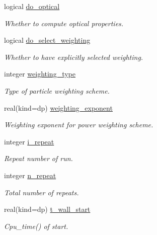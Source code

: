 \begin{DoxyCompactItemize}
logical \mbox{\hyperlink{structpmc__run__part_1_1run__part__opt__t_ac53591fa9c3c20d61beb05219a42abb9}{do\+\_\+optical}}
\begin{DoxyCompactList}\small\item\em Whether to compute optical properties. \end{DoxyCompactList}\item 
logical \mbox{\hyperlink{structpmc__run__part_1_1run__part__opt__t_aecedcb3bed6cb67aca91bda0e76b14d8}{do\+\_\+select\+\_\+weighting}}
\begin{DoxyCompactList}\small\item\em Whether to have explicitly selected weighting. \end{DoxyCompactList}\item 
integer \mbox{\hyperlink{structpmc__run__part_1_1run__part__opt__t_a7a73aba29b76062f29c5be56207eeb51}{weighting\+\_\+type}}
\begin{DoxyCompactList}\small\item\em Type of particle weighting scheme. \end{DoxyCompactList}\item 
real(kind=dp) \mbox{\hyperlink{structpmc__run__part_1_1run__part__opt__t_a212ce2a27235b07ea4c170ac6fab21ee}{weighting\+\_\+exponent}}
\begin{DoxyCompactList}\small\item\em Weighting exponent for power weighting scheme. \end{DoxyCompactList}\item 
integer \mbox{\hyperlink{structpmc__run__part_1_1run__part__opt__t_a6a7df18f13397113d5c5c219bfd356ba}{i\+\_\+repeat}}
\begin{DoxyCompactList}\small\item\em Repeat number of run. \end{DoxyCompactList}\item 
integer \mbox{\hyperlink{structpmc__run__part_1_1run__part__opt__t_a573ea390925d7c0113c29ad518a698a6}{n\+\_\+repeat}}
\begin{DoxyCompactList}\small\item\em Total number of repeats. \end{DoxyCompactList}\item 
real(kind=dp) \mbox{\hyperlink{structpmc__run__part_1_1run__part__opt__t_ae709919eaa2d685da003f3340cad23ce}{t\+\_\+wall\+\_\+start}}
\begin{DoxyCompactList}\small\item\em Cpu\+\_\+time() of start. \end{DoxyCompactList}\item 

\end{DoxyCompactItemize}
